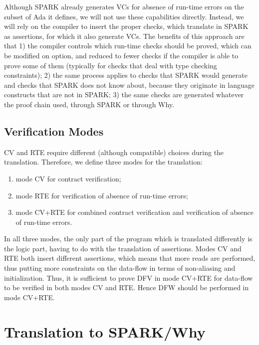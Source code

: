 \documentclass[fullpage]{article}
\begin{document}
Although SPARK already generates VCs for absence of run-time errors on the
subset of Ada it defines, we will not use these capabilities directly. Instead,
we will rely on the compiler to insert the proper checks, which translate in
SPARK as assertions, for which it also generate VCs. The benefits of this
approach are that 1) the compiler controls which run-time checks should be
proved, which can be modified on option, and reduced to fewer checks if the
compiler is able to prove some of them (typically for checks that deal with
type checking constraints); 2) the same process applies to checks that SPARK
would generate and checks that SPARK does not know about, because they
originate in language constructs that are not in SPARK; 3) the same checks are
generated whatever the proof chain used, through SPARK or through Why.

\subsection{Verification Modes}

CV and RTE require different (although compatible) choices during the
translation.  Therefore, we define three modes for the translation:
\begin{enumerate}
\item mode CV for contract verification;
\item mode RTE for verification of absence of run-time errors;
\item mode CV+RTE for combined contract verification and verification of
  absence of run-time errors.
\end{enumerate}

In all three modes, the only part of the program which is translated
differently is the logic part, having to do with the translation of
assertions. Modes CV and RTE both insert different assertions, which means that
more reads are performed, thus putting more constraints on the data-flow in
terms of non-aliasing and initialization. Thus, it is sufficient to prove DFV
in mode CV+RTE for data-flow to be verified in both modes CV and RTE. Hence DFW
should be performed in mode CV+RTE.

\section{Translation to SPARK/Why}
\end{document}
